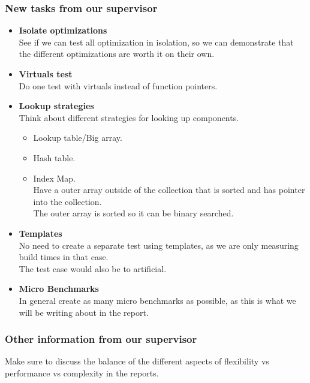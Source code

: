 \documentclass{article}
\begin{document}
\subsubsection*{New tasks from our supervisor}
\begin{itemize}
    \item \textbf{Isolate optimizations}\\
    See if we can test all optimization in isolation, so we can demonstrate that the different optimizations are worth it on their own.

    \item \textbf{Virtuals test}\\
    Do one test with virtuals instead of function pointers.

    \item \textbf{Lookup strategies}\\
    Think about different strategies for looking up components. 
    \begin{itemize}
        \item
        Lookup table/Big array.

        \item
        Hash table.

        \item
        Index Map.\\
        Have a outer array outside of the collection that is sorted and has pointer into the collection.\\
        The outer array is sorted so it can be binary searched.
    \end{itemize}
    
    \item \textbf{Templates}\\
    No need to create a separate test using templates, as we are only measuring build times in that case.\\
    The test case would also be to artificial.

    \item \textbf{Micro Benchmarks}\\
    In general create as many micro benchmarks as possible, as this is what we will be writing about in the report.
\end{itemize}

\subsubsection*{Other information from our supervisor}
Make sure to discuss the balance of the different aspects of flexibility vs performance vs complexity in the reports.
\end{document}
